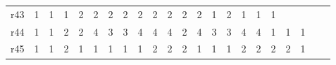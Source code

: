 {\begin{tabular}{l*{21}{r}}
r43& \cellcolor{magenta!10} 1& \cellcolor{magenta!10} 1& \cellcolor{magenta!10} 1& \cellcolor{magenta!10} 2& \cellcolor{magenta!10} 2& \cellcolor{magenta!10} 2& \cellcolor{magenta!10} 2& \cellcolor{magenta!10} 2& \cellcolor{magenta!10} 2& \cellcolor{magenta!10} 2& \cellcolor{magenta!10} 2& \cellcolor{magenta!10} 2& \cellcolor{magenta!10} 1& \cellcolor{magenta!10} 2& \cellcolor{magenta!10} 1& \cellcolor{magenta!10} 1& \cellcolor{magenta!10} 1& & & & \\ 
r44& \cellcolor{cyan!10} 1& \cellcolor{cyan!10} 1& \cellcolor{cyan!10} 2& \cellcolor{cyan!10} 2& \cellcolor{cyan!10} 4& \cellcolor{cyan!10} 3& \cellcolor{cyan!10} 3& \cellcolor{cyan!10} 4& \cellcolor{cyan!10} 4& \cellcolor{cyan!10} 4& \cellcolor{cyan!10} 2& \cellcolor{cyan!10} 4& \cellcolor{cyan!10} 3& \cellcolor{cyan!10} 3& \cellcolor{cyan!10} 4& \cellcolor{cyan!10} 4& \cellcolor{cyan!10} 1& \cellcolor{cyan!10} 1& \cellcolor{cyan!10} 1& & \\ 
r45& \cellcolor{cyan!10} 1& \cellcolor{cyan!10} 1& \cellcolor{cyan!10} 2& \cellcolor{cyan!10} 1& \cellcolor{cyan!10} 1& \cellcolor{cyan!10} 1& \cellcolor{cyan!10} 1& \cellcolor{cyan!10} 1& \cellcolor{cyan!10} 2& \cellcolor{cyan!10} 2& \cellcolor{cyan!10} 2& \cellcolor{cyan!10} 1& \cellcolor{cyan!10} 1& \cellcolor{cyan!10} 1& \cellcolor{cyan!10} 2& \cellcolor{cyan!10} 2& \cellcolor{cyan!10} 2& \cellcolor{cyan!10} 2& \cellcolor{cyan!10} 1& & \\ 
\bottomrule
\end{tabular}
}
